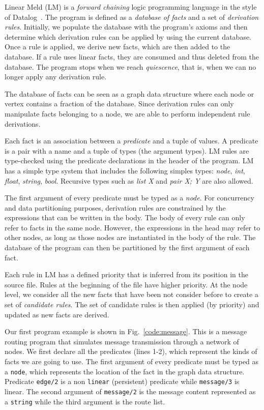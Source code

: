 
Linear Meld (LM) is a \emph{forward chaining} logic programming language in the style of Datalog~\cite{Ullman:1990:PDK:533142}. The program is defined as a \emph{database of facts} and a set of \emph{derivation rules}.
Initially, we populate the database with the program's axioms and then determine which derivation rules can be applied by using the current database. Once a rule is applied, we derive new facts, which are then added to the database.
If a rule uses linear facts, they are consumed and thus deleted from the database.
The program stops when we reach \emph{quiescence}, that is, when we can no longer
apply any derivation rule.

The database of facts can be seen as a graph data structure where each node or vertex contains a
fraction of the database.  Since derivation rules can only manipulate facts belonging to
a node, we are able to perform independent rule derivations.

Each fact is an association between a \emph{predicate} and a tuple of values. A predicate is a pair with a name and a tuple of types (the argument types).
LM rules are type-checked using the predicate declarations in the header of the program. LM has a simple type system that includes the following simples types:
\emph{node}, \emph{int}, \emph{float}, \emph{string}, \emph{bool}. Recursive types such as \emph{list X} and \emph{pair X; Y} are
also allowed.

The first argument of every predicate must be typed as a \emph{node}.
For concurrency and data partitioning purposes, derivation rules are constrained by the expressions that can be written in the body.
The body of every rule can only refer to facts in the same node.
However, the expressions in the head may refer to other nodes, as long as those nodes are instantiated in the body of the rule.
The database of the program can then be partitioned by the first argument of each fact.

Each rule in LM has a defined priority that is inferred from its position in the source file.
Rules at the beginning of the file have higher priority. At the node level, we consider all
the new facts that have been not consider before to create a set of \emph{candidate rules}.
The set of candidate rules is then applied (by priority) and updated as new facts are derived.

Our first program example is shown in Fig.~\ref{code:message}. This is a message routing program
that simulates message transmission through a network of nodes.
We first declare all the predicates (lines 1-2), which represent the kinds of facts we are going to
use. The first argument of every predicate must be typed as a \texttt{node}, which represents the location of the fact in
the graph data structure. Predicate \texttt{edge/2} is a non \texttt{linear} (persistent) predicate while \texttt{message/3} is linear.
The second argument of \texttt{message/2} is the message content represented as a \texttt{string}
while the third argument is the route list.

